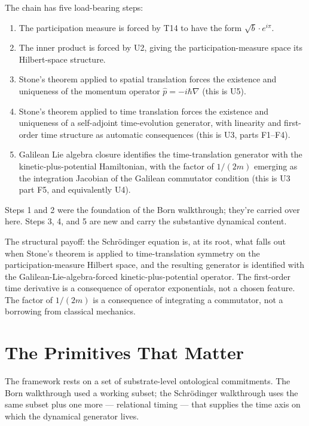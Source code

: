 \documentclass[11pt,a4paper]{article}
\begin{document}
The chain has five load-bearing steps:

\begin{enumerate}[noitemsep]
\item The participation measure is forced by T14 to have the form $\sqrt{b} \cdot e^{i\pi}$.
\item The inner product is forced by U2, giving the participation-measure space its Hilbert-space structure.
\item Stone's theorem applied to spatial translation forces the existence and uniqueness of the momentum operator $\hat{p} = -i\hbar\nabla$ (this is U5).
\item Stone's theorem applied to time translation forces the existence and uniqueness of a self-adjoint time-evolution generator, with linearity and first-order time structure as automatic consequences (this is U3, parts F1--F4).
\item Galilean Lie algebra closure identifies the time-translation generator with the kinetic-plus-potential Hamiltonian, with the factor of $1/(2m)$ emerging as the integration Jacobian of the Galilean commutator condition (this is U3 part F5, and equivalently U4).
\end{enumerate}

Steps 1 and 2 were the foundation of the Born walkthrough; they're carried over here. Steps 3, 4, and 5 are new and carry the substantive dynamical content.

The structural payoff: the Schr\"odinger equation is, at its root, what falls out when Stone's theorem is applied to time-translation symmetry on the participation-measure Hilbert space, and the resulting generator is identified with the Galilean-Lie-algebra-forced kinetic-plus-potential operator. The first-order time derivative is a consequence of operator exponentials, not a chosen feature. The factor of $1/(2m)$ is a consequence of integrating a commutator, not a borrowing from classical mechanics.

\section{The Primitives That Matter}

The framework rests on a set of substrate-level ontological commitments. The Born walkthrough used a working subset; the Schr\"odinger walkthrough uses the same subset plus one more --- relational timing --- that supplies the time axis on which the dynamical generator lives.
\end{document}
